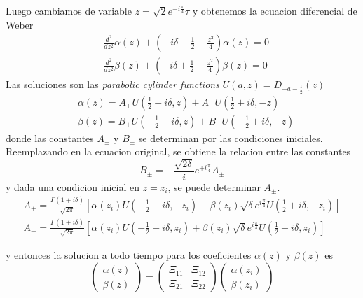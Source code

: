 Luego cambiamos de variable $z=\sqrt{2}e^{-i\frac{\pi}{4}}\tau$ y obtenemos la ecuacion diferencial de Weber
\begin{align}
    &\frac{d^2}{dz^2}\alpha(z) + \left(-i\delta-\frac{1}{2}-\frac{z^2}{4}\right)\alpha(z)=0 \\
    &\frac{d^2}{dz^2}\beta(z) + \left(-i\delta+\frac{1}{2}-\frac{z^2}{4}\right)\beta(z)=0
\end{align}
Las soluciones son las \textit{parabolic cylinder functions} $U(a,z)=D_{-a-\frac{1}{2}}(z)$ \cite{abramowitz1964handbook} 
\begin{align}
    &\alpha(z)=A_+ U(\frac{1}{2}+i\delta, z) + A_- U(\frac{1}{2}+i\delta, -z) \\
    &\beta(z)=B_+ U(-\frac{1}{2}+i\delta, z) + B_- U(-\frac{1}{2}+i\delta, -z)
\end{align}
donde las constantes $A_\pm$ y $B_\pm$ se determinan por las condiciones iniciales. Reemplazando en la ecuacion original, se obtiene la relacion entre las constantes
\begin{equation}
    B_\pm = -\frac{\sqrt{2\delta}}{i} e^{\mp i\frac{\pi}{4}} A_\pm
\end{equation}
y dada una condicion inicial en $z=z_i$, se puede determinar $A_\pm$.
\begin{align}
    A_+=\frac{\Gamma(1+i\delta)}{\sqrt{2\pi}} \left[ \alpha(z_i)U(-\frac{1}{2}+i\delta, -z_i) - \beta(z_i) \sqrt{\delta} e^{i\frac{\pi}{4}} U(\frac{1}{2}+i\delta, -z_i) \right] \\
    A_-=\frac{\Gamma(1+i\delta)}{\sqrt{2\pi}} \left[ \alpha(z_i)U(-\frac{1}{2}+i\delta, z_i) + \beta(z_i)\sqrt{\delta} e^{i\frac{\pi}{4}} U(\frac{1}{2}+i\delta, z_i) \right]
\end{align}

y entonces la solucion a todo tiempo para los coeficientes $\alpha(z)$ y $\beta(z)$ es
\begin{equation}
    \begin{pmatrix}
    \alpha(z) \\
    \beta(z)
    \end{pmatrix} =
    \begin{pmatrix}
        \Xi_{11} & \Xi_{12} \\
        \Xi_{21} & \Xi_{22}
    \end{pmatrix} 
    \begin{pmatrix}
    \alpha(z_i) \\
    \beta(z_i)
    \end{pmatrix}
\end{equation}

